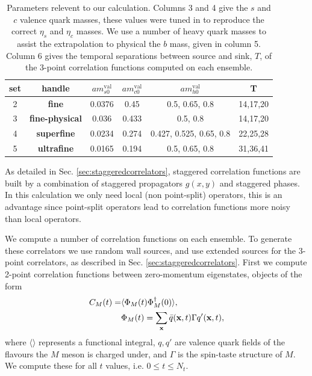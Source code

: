 \begin{table}
  \begin{center}
    \begin{tabular}{c c c c c c}
      \hline
      set & handle & $am_{s0}^{\text{val}}$ & $am_{c0}^{\text{val}}$ & $am^{\text{val}}_{h0}$ & T \\ [0.5ex]
      \hline
      2 & \bf{fine} & 0.0376 & 0.45 
      & 0.5, 0.65, 0.8 & 14,17,20 \\ [1ex]
      3 & \bf{fine-physical} & 0.036 & 0.433 
      & 0.5, 0.8 & 14,17,20 \\ [1ex]
      4 & \bf{superfine} & 0.0234 & 
      0.274 & 0.427, 0.525, 0.65, 0.8  & 22,25,28  \\ [1ex]
      5 & \bf{ultrafine} & 0.0165 
      & 0.194 & 0.5, 0.65, 0.8 & 31,36,41\\ [1ex]
      \hline
    \end{tabular}
  \end{center}
  \caption{Parameters relevent to our calculation. Columns 3 and 4 give the $s$ and $c$ valence quark masses, these values were tuned in \cite{Chakraborty:2014aca} to reproduce the correct $\eta_s$ and $\eta_c$ masses. We use a number of heavy quark masses to assist the extrapolation to physical the $b$ mass, given in column 5. Column 6 gives the temporal separations between source and sink, $T$, of the 3-point correlation functions computed on each ensemble.}
  \label{tab:BsDsensembles}
\end{table}

As detailed in Sec. \ref{sec:staggeredcorrelators}, staggered correlation functions are built by a combination of staggered propagators $g(x,y)$ and staggered phases. In this calculation we only need local (non point-split) operators, this is an advantage since point-split operators lead to correlation functions more noisy than local operators. 

We compute a number of correlation functions on each ensemble. To generate these correlators we use random wall sources, and use extended sources for the 3-point correlators, as described in Sec. \ref{sec:staggeredcorrelators}. First we compute 2-point correlation functions between zero-momentum eigenstates, objects of the form
\begin{align}
  C_{M}(t) =& \langle \Phi_M (t) \Phi_M^{\dagger}(0) \rangle, \\ 
  &\Phi_M(t) = \sum_{{\bf{x}}} \bar{q}({\bf{x}},t) \Gamma q'({\bf{x}},t), \nonumber
\end{align}
where $\langle \rangle$ represents a functional integral, $q,q'$ are valence quark fields of the flavours the $M$ meson is charged under, and $\Gamma$ is the spin-taste structure of $M$. We compute these for all $t$ values, i.e. $0\leq t \leq N_t$. 

